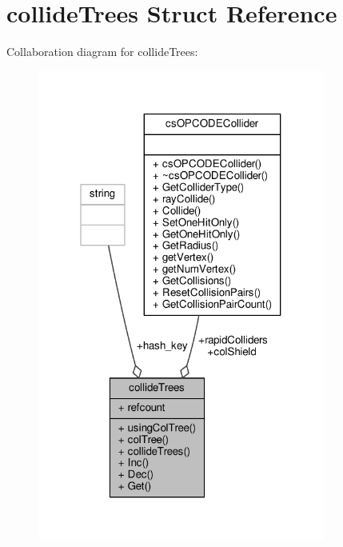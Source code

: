 \hypertarget{structcollideTrees}{}\section{collide\+Trees Struct Reference}
\label{structcollideTrees}


Collaboration diagram for collide\+Trees\+:
\nopagebreak
\begin{figure}[H]
\begin{center}
\leavevmode
\includegraphics[width=268pt]{d3/d72/structcollideTrees__coll__graph}
\end{center}
\end{figure}
